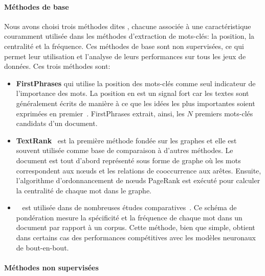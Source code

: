 \paragraph{Méthodes de base}
Nous avons choisi trois méthodes dites , chacune associée à une caractéristique couramment utilisée dans les méthodes d'extraction de mots-clés: la position, la centralité et la fréquence.
Ces méthodes de base sont non supervisées, ce qui permet leur utilisation et l'analyse de leurs performances sur tous les jeux de données. Ces trois méthodes sont:
\begin{itemize}
    \item \textbf{FirstPhrases} qui utilise la position des mots-clés comme seul indicateur de l'importance des mots. La position en est un signal fort car les textes sont généralement écrits de manière à ce que les idées les plus importantes soient exprimées en premier~\cite{marcu_rhetorical_1997}. FirstPhrases extrait, ainsi, les $N$ premiers mots-clés candidats d'un document.
    \item \textbf{TextRank}~\cite{mihalcea_textrank:_2004} est la première méthode fondée sur les graphes et elle est souvent utilisée comme base de comparaison à d'autres méthodes. Le document est tout d'abord représenté sous forme de graphe où les mots correspondent aux n\oe{}uds et les relations de cooccurrence aux arêtes. Ensuite, l'algorithme d'ordonnancement de n\oe{}uds PageRank est exécuté pour calculer la centralité de chaque mot dans le graphe.
    \item \textbf{\tfidf{}}~\cite{salton_term-weighting_1988} est utilisée dans de nombreuses études comparatives~\cite[\textit{inter alia}]{kim_semeval-2010_2010,meng_deep_2017}.
    Ce schéma de pondération mesure la spécificité et la fréquence de chaque mot dans un document par rapport à un corpus.
    Cette méthode, bien que simple, obtient dans certains cas des performances compétitives avec les modèles neuronaux de bout-en-bout.
\end{itemize}

\paragraph{Méthodes non supervisées}

